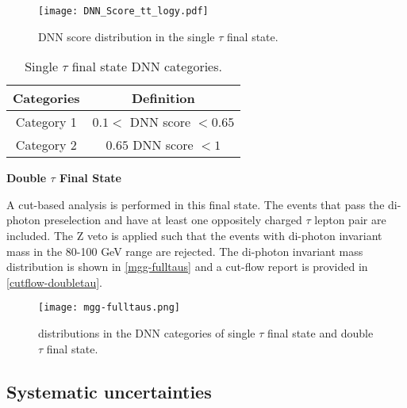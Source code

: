{\begin{figure}[h!]
    \centering
	\texttt{[image: DNN\_Score\_tt\_logy.pdf]}
	\vspace{2mm}
	\caption{DNN score distribution in the single $\tau$ final state.}
	\label{dnnscore-singletau}
\end{figure}

\begin{table}[h!]
    \centering
    \begin{tabular}{cc}
    \hline
        Categories  &   Definition \\
        \hline
        Category 1 & $ 0.1< $ DNN score $ <0.65$ \\
        Category 2 & $ 0.65 $ DNN score $ <1 $\\
         \hline
    \end{tabular}
    \caption{Single $\tau$ final state DNN categories.}
    \label{onetau-cats}
\end{table}

\textbf{Double $\tau$ Final State}

A cut-based analysis is performed in this final state. The events that pass the di-photon preselection and have at least one oppositely charged $\tau$ lepton pair are included. The Z veto is applied such that the events with di-photon invariant mass in the 80-100 GeV range are rejected. The di-photon invariant mass distribution is shown in \autoref{mgg-fulltaus} and a cut-flow report is provided in \autoref{cutflow-doubletau}.

\begin{figure}[h!]
    \centering
	\texttt{[image: mgg-fulltaus.png]}
	\vspace{2mm}
	\caption{\mgg distributions in the DNN categories of single $\tau$ final state and double $\tau$ final state.}
	\label{mgg-fulltaus}
\end{figure}

\subsection{Systematic uncertainties}

}
